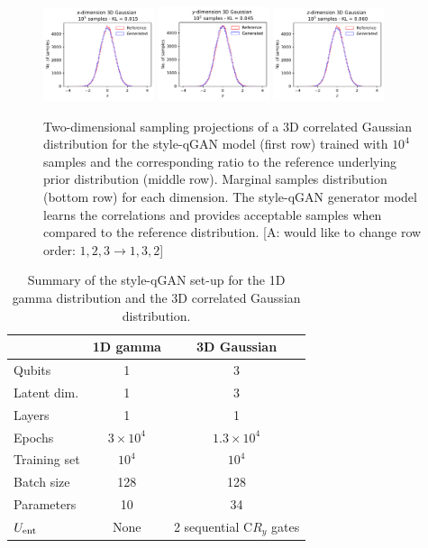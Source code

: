 \documentclass[twocolumn,preprintnumbers,superscriptaddress]{revtex4-2}
\newcommand{\commentAF}[1]{{\color{cyan} {[A: #1]}}}
\begin{document}
\begin{figure}
  \includegraphics[width=0.29\textwidth]{plots/3Dgaussian_posdef/1-distribution_3dgaussian_100k.pdf}%
  \includegraphics[width=0.29\textwidth]{plots/3Dgaussian_posdef/2-distribution_3dgaussian_100k.pdf}%
  \includegraphics[width=0.29\textwidth]{plots/3Dgaussian_posdef/3-distribution_3dgaussian_100k.pdf}

  \caption{\label{fig:3dgauss}Two-dimensional sampling projections of a 3D
  correlated Gaussian distribution for the style-qGAN model (first row) trained
  with $10^4$ samples and the corresponding ratio to the reference underlying
  prior distribution (middle row). Marginal samples distribution (bottom row)
  for each dimension. The style-qGAN generator model learns the correlations and
  provides acceptable samples when compared to the reference distribution. \commentAF{would like to change row order: $1,2,3 \rightarrow 1,3,2$}}
\end{figure}

\begin{table}
  \begin{tabular}{l|c|c}
     & {\bf 1D gamma} & {\bf 3D Gaussian} \tabularnewline
    \hline
    Qubits & 1 & 3 \tabularnewline
    Latent dim. & 1 & 3 \tabularnewline
    Layers & 1 & 1 \tabularnewline
    Epochs & $3\times10^4$ & $1.3\times10^4$ \tabularnewline
    Training set & $10^4$ & $10^4$ \tabularnewline
    Batch size & 128 & 128 \tabularnewline
    Parameters & 10 & 34 \tabularnewline
    $U_{\rm ent}$ & None & 2 sequential C$R_y$ gates \tabularnewline
    \hline
  \end{tabular}

  \caption{\label{table:summary} Summary of the style-qGAN set-up for the 1D
  gamma distribution and the 3D correlated Gaussian distribution.}
\end{table}
\end{document}
